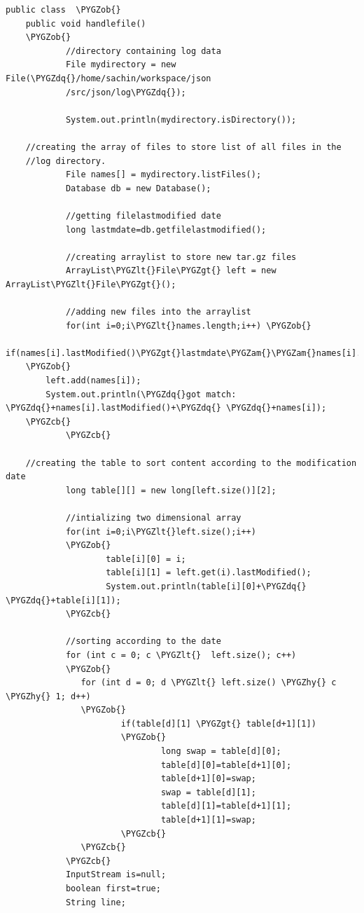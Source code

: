 \documentclass[a4paper,12pt,oneside]{sphinxmanual}
\def\PYGZob{\char`\{}
\def\PYGZcb{\char`\}}
\def\PYGZam{\char`\&}
\def\PYGZlt{\char`\<}
\def\PYGZgt{\char`\>}
\def\PYGZdl{\char`\$}
\def\PYGZhy{\char`\-}
\def\PYGZdq{\char`\"}
\begin{document}
\begin{Verbatim}[commandchars=\\\{\}]
public class  \PYGZob{}
    public void handlefile()
    \PYGZob{}
            //directory containing log data
            File mydirectory = new File(\PYGZdq{}/home/sachin/workspace/json
            /src/json/log\PYGZdq{});

            System.out.println(mydirectory.isDirectory());

    //creating the array of files to store list of all files in the
    //log directory.
            File names[] = mydirectory.listFiles();
            Database db = new Database();

            //getting filelastmodified date
            long lastmdate=db.getfilelastmodified();

            //creating arraylist to store new tar.gz files
            ArrayList\PYGZlt{}File\PYGZgt{} left = new ArrayList\PYGZlt{}File\PYGZgt{}();

            //adding new files into the arraylist
            for(int i=0;i\PYGZlt{}names.length;i++) \PYGZob{}
    if(names[i].lastModified()\PYGZgt{}lastmdate\PYGZam{}\PYGZam{}names[i].toString().matches(\PYGZdq{}.*gz\PYGZdl{}\PYGZdq{}))
    \PYGZob{}
        left.add(names[i]);
        System.out.println(\PYGZdq{}got match: \PYGZdq{}+names[i].lastModified()+\PYGZdq{} \PYGZdq{}+names[i]);
    \PYGZcb{}
            \PYGZcb{}

    //creating the table to sort content according to the modification date
            long table[][] = new long[left.size()][2];

            //intializing two dimensional array
            for(int i=0;i\PYGZlt{}left.size();i++)
            \PYGZob{}
                    table[i][0] = i;
                    table[i][1] = left.get(i).lastModified();
                    System.out.println(table[i][0]+\PYGZdq{} \PYGZdq{}+table[i][1]);
            \PYGZcb{}

            //sorting according to the date
            for (int c = 0; c \PYGZlt{}  left.size(); c++)
            \PYGZob{}
               for (int d = 0; d \PYGZlt{} left.size() \PYGZhy{} c \PYGZhy{} 1; d++)
               \PYGZob{}
                       if(table[d][1] \PYGZgt{} table[d+1][1])
                       \PYGZob{}
                               long swap = table[d][0];
                               table[d][0]=table[d+1][0];
                               table[d+1][0]=swap;
                               swap = table[d][1];
                               table[d][1]=table[d+1][1];
                               table[d+1][1]=swap;
                       \PYGZcb{}
               \PYGZcb{}
            \PYGZcb{}
            InputStream is=null;
            boolean first=true;
            String line;


\end{Verbatim}
\end{document}
